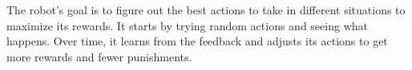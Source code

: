 \documentclass[12pt,oneside]{article}
\begin{document}
The robot's goal is to figure out the best actions to take in different situations to maximize its rewards. It starts by trying random actions and seeing what happens. Over time, it learns from the feedback and adjusts its actions to get more rewards and fewer punishments. 
\begin{figure}[H]
  \centering
  \\

\end{figure}
\end{document}
